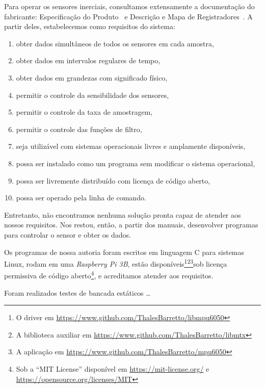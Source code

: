 Para operar os sensores inerciais, consultamos extensamente a documentação do fabricante: Especificação do Produto~\cite{mpu6050ps} e Descrição e Mapa de Registradores~\cite{mpu6050rm}.
A partir deles, estabelecemos como requisitos do sistema:
\begin{enumerate}
        \item obter dados simultâneos de todos os sensores em cada amostra,
        \item obter dados em intervalos regulares de tempo,
        \item obter dados em grandezas com significado físico,
        \item permitir o controle da sensibilidade dos sensores,
        \item permitir o controle da taxa de amostragem,
        \item permitir o controle das funções de filtro,
        \item seja utilizável com sistemas operacionais livres e amplamente disponíveis,
        \item possa ser instalado como um programa sem modificar o sistema operacional,
        \item possa ser livremente distribuído com licença de código aberto,
        \item possa ser operado pela linha de comando.
\end{enumerate}

Entretanto, não encontramos nenhuma solução pronta capaz de atender aos nossos requisitos. Nos restou, então, a partir dos manuais, desenvolver programas para controlar o sensor e obter os dados.

Os programas de nossa autoria foram escritos em linguagem C para sistemas Linux, rodam em uma \emph{Raspberry Pi 3B}, estão disponíveis\footnote{O driver em \href{https://www.github.com/ThalesBarretto/libmpu6050}{https://www.github.com/ThalesBarretto/libmpu6050}}\footnote{A biblioteca auxiliar em \href{https://www.github.com/ThalesBarretto/libmtx}{https://www.github.com/ThalesBarretto/libmtx}}\footnote{A aplicação em \href{https://www.github.com/ThalesBarretto/mpu6050}{https://www.github.com/ThalesBarretto/mpu6050}}sob licença permissiva de código aberto\footnote{Sob a ``MIT License'' disponível em \href{https://mit-license.org/}{https://mit-license.org/} e \href{https://opensource.org/licenses/MIT}{https://opensource.org/licenses/MIT}}, e acreditamos atender aos requisitos.

Foram realizados testes de bancada estáticos \ldots

